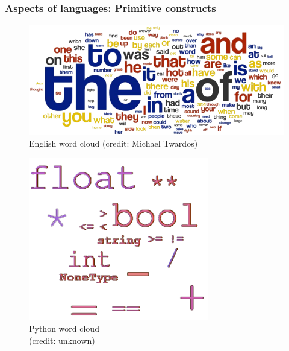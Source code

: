 \documentclass[notes]{beamer}
\begin{document}
\begin{frame}
	\frametitle{Aspects of languages: Primitive constructs}
	\begin{minipage}[t]{0.59\linewidth}	
		\begin{figure}[ht]
			\centering
			\includegraphics[width=\textwidth]{figs/english-word-cloud.png}
			\caption*{English word cloud (credit: Michael Twardos)}
		\end{figure}
	\end{minipage}%
	\hfill%
	\begin{minipage}[t]{0.39\linewidth}
		\begin{figure}[ht]
			\centering
			\includegraphics[width=0.7\textwidth]{figs/python-word-cloud.png}
			\caption*{Python word cloud \\ (credit: unknown)}
		\end{figure}
	\end{minipage}%
\end{frame}
\end{document}
